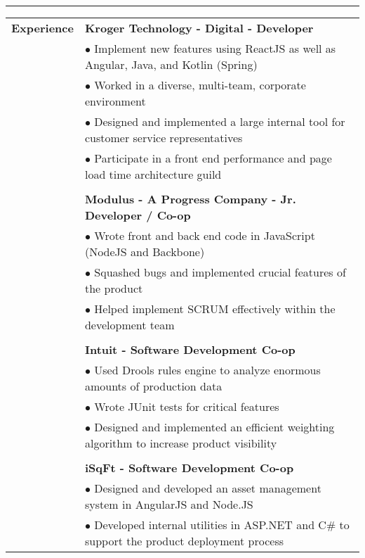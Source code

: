 \documentclass[11pt]{article} %
\begin{document}
\begin{small}
			\vspace*{.75\baselineskip}\hrule\vspace*{1\baselineskip}		
	\begin{tabular}[t]{p{3cm} p{16cm}}\large{\textbf{Experience}} 
				& \textbf{Kroger Technology - Digital - Developer} \color{gray}{January 2016 - Present} 	                               \\
 	  			& $\bullet$ Implement new features using ReactJS as well as Angular, Java, and Kotlin (Spring)		      \\
				& $\bullet$ Worked in a diverse, multi-team, corporate environment								      \\
				& $\bullet$ Designed and implemented a large internal tool for customer service representatives     		      \\
				& $\bullet$ Participate in a front end performance and page load time architecture guild                                    \\
				& \\
 	  			& \textbf{Modulus - A Progress Company - Jr. Developer / Co-op} \color{gray}{April 2015 - January 2016} 	        \\
 	  			& $\bullet$ Wrote front and back end code in JavaScript (NodeJS and Backbone) 						\\
 	  			& $\bullet$ Squashed bugs and implemented crucial features of the product  							\\
				& $\bullet$ Helped implement SCRUM effectively within the development team							\\
				& \\
				& \textbf{Intuit - Software Development Co-op} \color{gray}{January - April 2015} 						\\
 	  			& $\bullet$ Used Drools rules engine to analyze enormous amounts of production data               			\\
 	  			& $\bullet$ Wrote JUnit tests for critical features 												\\
				& $\bullet$ Designed and implemented an efficient weighting algorithm to increase product visibility 			\\
				& \\ 
				& \textbf{iSqFt - Software Development Co-op} \color{gray}{Spring/Fall 2013, and Summer 2014}  			\\
 	   			& $\bullet$ Designed and developed an asset management system in AngularJS and Node.JS				\\
 	  			& $\bullet$ Developed internal utilities in ASP.NET and C\# to support the product deployment process 		\\ 

\end{tabular}
\end{small}
\end{document}
